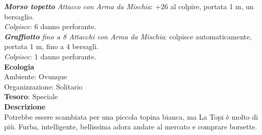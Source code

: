 \begin{multicols}{2}
\textit{\textbf{Morso topetto} Attacco con Arma da Mischia}: +26 al colpire, portata 1 m, un bersaglio.\\
\textit{Colpisce:} 6 danno perforante.\\
\textit{\textbf{Graffiotto} fino a 8 Attacchi con Arma da Mischia}: colpisce automaticamente, portata 1 m, fino a 4 bersagli.\\
\textit{Colpisce:} 1 danno perforante.\\
\textbf{Ecologia}\\
Ambiente: Ovunque\\
Organizzazione: Solitario\\
\textbf{Tesoro}: Speciale\\
\textbf{Descrizione}\\
Potrebbe essere scambiata per una piccola topina bianca, ma La Topi è molto di più. Furba, intelligente, bellissima adora andare al mercato e comprare borsette.



\end{multicols}
